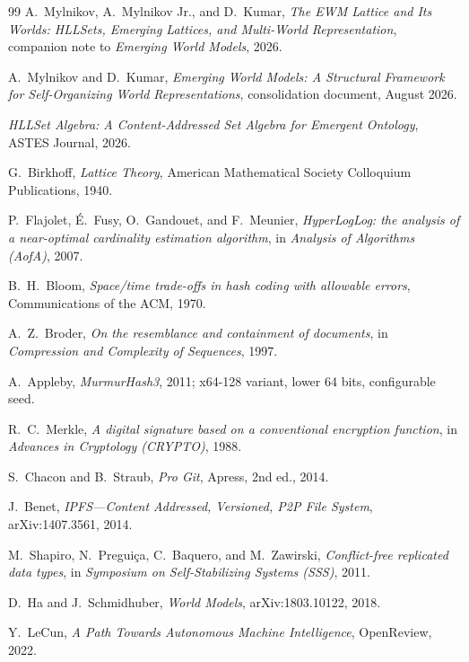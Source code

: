 \documentclass[11pt,a4paper]{article}
\theoremstyle{remark}
\begin{document}
\begin{thebibliography}{99}
 A.~Mylnikov, A.~Mylnikov Jr., and D.~Kumar,
\textit{The EWM Lattice and Its Worlds: HLLSets, Emerging Lattices, and
Multi-World Representation}, companion note to \textit{Emerging World Models},
2026.

 A.~Mylnikov and D.~Kumar, \textit{Emerging World Models: A
Structural Framework for Self-Organizing World Representations}, consolidation
document, August 2026.

 \textit{HLLSet Algebra: A Content-Addressed Set Algebra for
Emergent Ontology}, ASTES Journal, 2026.

 G.~Birkhoff, \textit{Lattice Theory}, American
Mathematical Society Colloquium Publications, 1940.

 P.~Flajolet, \'E.~Fusy, O.~Gandouet, and F.~Meunier,
\textit{HyperLogLog: the analysis of a near-optimal cardinality estimation
algorithm}, in \textit{Analysis of Algorithms (AofA)}, 2007.

 B.~H.~Bloom, \textit{Space/time trade-offs in hash coding
with allowable errors}, Communications of the ACM, 1970.

 A.~Z.~Broder, \textit{On the resemblance and containment of
documents}, in \textit{Compression and Complexity of Sequences}, 1997.

 A.~Appleby, \textit{MurmurHash3}, 2011; x64-128 variant, lower
64 bits, configurable seed.

 R.~C.~Merkle, \textit{A digital signature based on a
conventional encryption function}, in \textit{Advances in Cryptology
(CRYPTO)}, 1988.

 S.~Chacon and B.~Straub, \textit{Pro Git}, Apress, 2nd ed., 2014.

 J.~Benet, \textit{IPFS---Content Addressed, Versioned,
P2P File System}, arXiv:1407.3561, 2014.

 M.~Shapiro, N.~Pregui\c{c}a, C.~Baquero, and
M.~Zawirski, \textit{Conflict-free replicated data types}, in \textit{Symposium
on Self-Stabilizing Systems (SSS)}, 2011.

 D.~Ha and J.~Schmidhuber, \textit{World Models}, arXiv:1803.10122,
2018.

 Y.~LeCun, \textit{A Path Towards Autonomous Machine
Intelligence}, OpenReview, 2022.


\end{thebibliography}
\end{document}
